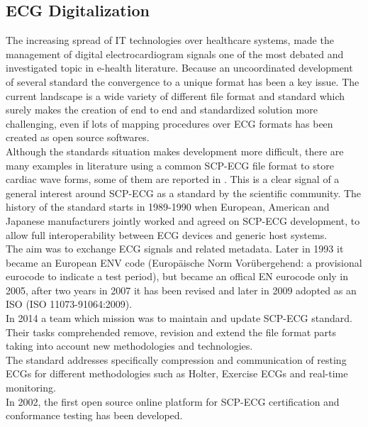 \subsection{ECG Digitalization}
\label{subsection:ecgdigitaliation}
The increasing spread of IT technologies over healthcare systems, made the management of digital electrocardiogram signals one of the most debated and investigated topic in e-health literature. Because an uncoordinated development of several standard the convergence to a unique format has been a key issue. \cite{trigo} The current landscape is a wide variety of different file format and standard which surely makes the creation of end to end and standardized solution more challenging, even if lots of mapping procedures over ECG formats has been created as open source softwares.\\
Although the standards situation makes development more difficult, there are many examples in literature using a common SCP-ECG file format to store cardiac wave forms, some of them are reported in \cite{trigo}. This is a clear signal of a general interest around SCP-ECG as a standard by the scientific community. The history of the standard starts in 1989-1990 when European, American and Japanese manufacturers jointly worked and agreed on SCP-ECG development, to allow full interoperability between ECG devices and generic host systems.\\
The aim was to exchange ECG signals and related metadata.
Later in 1993 it became an European ENV code (Europäische Norm Vorübergehend: a provisional eurocode to indicate a test period), but became an offical EN eurocode only in 2005, after two years in 2007 it has been revised and later in 2009 adopted as an ISO (ISO 11073-91064:2009).\\
In 2014 a team which mission was to maintain and update SCP-ECG standard. Their tasks comprehended remove, revision and extend the file format parts taking into account new methodologies and technologies.\cite{danilopani}\\
The standard addresses specifically compression and communication of resting ECGs for different methodologies such as Holter, Exercise ECGs and real-time monitoring.\\
In 2002, the first open source online platform for SCP-ECG certification and conformance testing has been developed.\cite{Chronaki}\\

